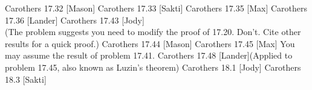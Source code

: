 \documentclass[minion]{homework}
\begin{document}
\begin{aproblems}


\hproblem Carothers 17.32 [Mason]
\hproblem Carothers 17.33 [Sakti]
\hproblem Carothers 17.35 [Max]
\hproblem Carothers 17.36 [Lander]
\hproblem Carothers 17.43 [Jody]\\
(The problem suggests you need to modify the proof of 17.20.  Don't. Cite other results for a quick proof.)
\hproblem Carothers 17.44 [Mason]
\hproblem Carothers 17.45 [Max] You may assume the result of problem 17.41.
\hproblem Carothers 17.48 [Lander](Applied to problem 17.45, also known as Luzin's theorem)
\hproblem Carothers 18.1 [Jody]
\hproblem Carothers 18.3 [Sakti]


\end{aproblems}
\end{document}
